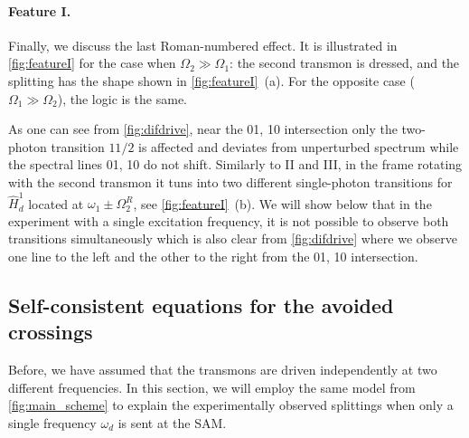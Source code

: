\documentclass[%
 aps, prx,
 amsmath,amssymb,
 reprint,%
superscriptaddress
]{revtex4-2}
\begin{document}
\paragraph{Feature I.} Finally, we discuss the 
last Roman-numbered effect. It is illustrated in 
\autoref{fig:featureI} for the case when 
$\Omega_2 \gg \Omega_1$: the second transmon is 
dressed, and the splitting has the shape shown in 
\autoref{fig:featureI}~(a). For the opposite case 
($\Omega_1 \gg \Omega_2$), the logic is the same. 

As one can see from \autoref{fig:difdrive}, near the 01, 10 intersection only the two-photon transition $11/2$ is affected and deviates from unperturbed spectrum while the spectral lines 01, 10 do not shift. Similarly to II and III, in the frame rotating with the second transmon it tuns into two different single-photon transitions for $\hat H_d^1$ located at $\omega_1 \pm \Omega_2^R$, see \autoref{fig:featureI}~(b). We will show below that in the experiment with a single excitation frequency, it is not possible to observe both transitions simultaneously which is also clear from \autoref{fig:difdrive} where we observe one line to the left and the other to the right from the 01, 10 intersection.




\subsection{Self-consistent equations for the avoided crossings}
\label{sec:münchhausen}

Before, we have assumed that the transmons are driven independently at two different frequencies. In this section, we will employ the same model from \autoref{fig:main_scheme} to explain the experimentally observed splittings when only a single frequency $\omega_d$ is sent at the SAM. 
\end{document}
